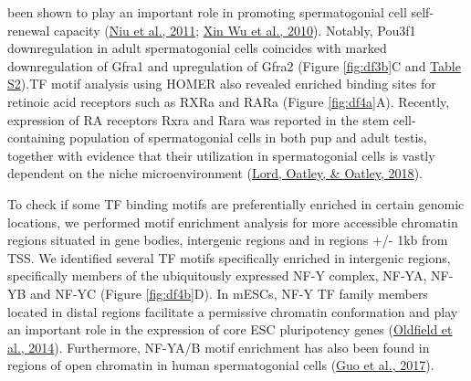 \documentclass[12pt,twoside]{reedthesis}
\begin{document}
been shown to play an important role in promoting spermatogonial cell
self-renewal capacity (\protect\hyperlink{ref-niu2011}{Niu et al., 2011}; \protect\hyperlink{ref-wu2010a}{Xin Wu et al., 2010}). Notably, Pou3f1
downregulation in adult spermatogonial cells coincides with marked
downregulation of Gfra1 and upregulation of Gfra2 (Figure \ref{fig:df3b}C and \protect\hyperlink{st}{Table S2}).TF motif analysis using HOMER also revealed enriched binding sites
for retinoic acid receptors such as RXRa and RARa
(Figure \ref{fig:df4a}A). Recently, expression of RA receptors Rxra and
Rara was reported in the stem cell-containing population of
spermatogonial cells in both pup and adult testis, together with
evidence that their utilization in spermatogonial cells is vastly
dependent on the niche microenvironment (\protect\hyperlink{ref-lord2018}{Lord, Oatley, \& Oatley, 2018}).

To check if some TF binding motifs are preferentially enriched in
certain genomic locations, we performed motif enrichment analysis for
more accessible chromatin regions situated in gene bodies, intergenic
regions and in regions +/- 1kb from TSS. We identified several TF motifs
specifically enriched in intergenic regions, specifically members of the
ubiquitously expressed NF-Y complex, NF-YA, NF-YB and NF-YC (Figure \ref{fig:df4b}D).
In mESCs, NF-Y TF family members located in distal regions facilitate a
permissive chromatin conformation and play an important role in the
expression of core ESC pluripotency genes (\protect\hyperlink{ref-oldfield2014}{Oldfield et al., 2014}). Furthermore,
NF-YA/B motif enrichment has also been found in regions of open
chromatin in human spermatogonial cells (\protect\hyperlink{ref-guo2017}{Guo et al., 2017}).
\end{document}
